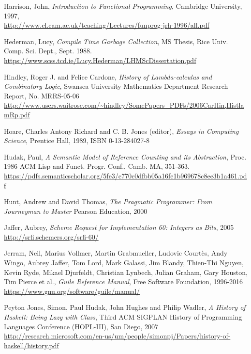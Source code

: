 \begin{thebibliography}{90}
  Harrison, John,
  \emph{Introduction to Functional Programming},
  Cambridge University, 1997, \\
  \url{http://www.cl.cam.ac.uk/teaching/Lectures/funprog-jrh-1996/all.pdf}

  Hederman, Lucy,
  \emph{Compile Time Garbage Collection},
  MS Thesis, Rice Univ. Comp. Sci. Dept., Sept. 1988. \\
  \url{https://www.scss.tcd.ie/Lucy.Hederman/LHMScDissertation.pdf}
  
  Hindley, Roger J. and Felice Cardone,
  \emph{History of Lambda-calculus and Combinatory Logic},
  Swansea University Mathematics Department Research Report,
  No. MRRS-05-06 \\
  \url{http://www.users.waitrose.com/~hindley/SomePapers_PDFs/2006CarHin,HistlamRp.pdf}

  Hoare, Charles Antony Richard and C. B. Jones (editor),
  \emph{Essays in Computing Science},
  Prentice Hall, 1989, ISBN 0-13-284027-8
  
 Hudak, Paul,
  \emph{A Semantic Model of Reference Counting and its Abstraction},
  Proc. 1986 ACM Lisp and Funct. Progr. Conf., Camb. MA, 351-363. \\
  \url{https://pdfs.semanticscholar.org/5fe3/c770c0dfbb05a16fe1b969678c8ee3b1a461.pdf}
  
  Hunt, Andrew and David Thomas,
  \emph{The Pragmatic Programmer: From Journeyman to Master}
  Pearson Education, 2000

  Jaffer, Aubrey,
  \emph{Scheme Request for Implementation 60: Integers as Bits}, 2005 \\
  \url{http://srfi.schemers.org/srfi-60/}

  Jerram, Neil, Marius Vollmer, Martin Grabmueller, Ludovic Courtès,
  Andy Wingo, Aubrey Jaffer, Tom Lord, Mark Galassi, Jim Blandy,
  Thien-Thi Nguyen, Kevin Ryde, Mikael Djurfeldt, Christian Lynbech,
  Julian Graham, Gary Houston, Tim Pierce et al., \emph{Guile Reference Manual},
  Free Software Foundation, 1996-2016 \\
  \url{https://www.gnu.org/software/guile/manual/}
  
  Peyton Jones, Simon, Paul Hudak, John Hughes and Philip Wadler,
  \emph{A History of Haskell: Being Lazy with Class},
  Third ACM SIGPLAN History of Programming Languages Conference (HOPL-III),
  San Diego, 2007 \\
  \url{http://research.microsoft.com/en-us/um/people/simonpj/Papers/history-of-haskell/history.pdf}


\end{thebibliography}
